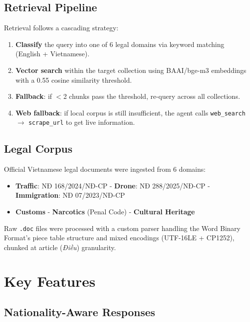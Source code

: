 \documentclass[conference, onecolumn]{IEEEtran}
\begin{document}
\subsection{Retrieval Pipeline}

Retrieval follows a cascading strategy:

\begin{enumerate}[leftmargin=*]
    \item \textbf{Classify} the query into one of 6 legal domains via keyword matching (English + Vietnamese).
    \item \textbf{Vector search} within the target collection using BAAI/bge-m3 embeddings with a 0.55 cosine similarity threshold.
    \item \textbf{Fallback}: if $<$2 chunks pass the threshold, re-query across all collections.
    \item \textbf{Web fallback}: if local corpus is still insufficient, the agent calls \texttt{web\_search} $\rightarrow$ \texttt{scrape\_url} to get live information.
\end{enumerate}

\subsection{Legal Corpus}

Official Vietnamese legal documents were ingested from 6 domains:

\begin{itemize}[leftmargin=*]
    \item \textbf{Traffic}: NĐ 168/2024/NĐ-CP  -  \textbf{Drone}: NĐ 288/2025/NĐ-CP  -  \textbf{Immigration}: NĐ 07/2023/NĐ-CP
    \item \textbf{Customs}  -  \textbf{Narcotics} (Penal Code)  -  \textbf{Cultural Heritage}
\end{itemize}

Raw \texttt{.doc} files were processed with a custom parser handling the Word Binary Format's piece table structure and mixed encodings (UTF-16LE + CP1252), chunked at article (\textit{Điều}) granularity.

\section{Key Features}

\subsection{Nationality-Aware Responses}
\end{document}

